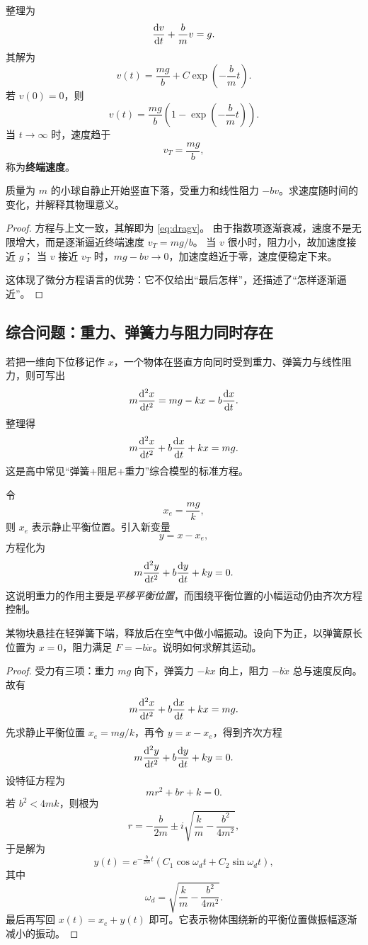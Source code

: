 整理为
\[
  \dv{v}{t}+\frac{b}{m}v=g.
\]
其解为
\[
  v(t)=\frac{mg}{b}+C\exp\left(-\frac{b}{m}t\right).
\]
若 $v(0)=0$，则
\begin{equation}
  v(t)=\frac{mg}{b}\left(1-\exp\left(-\frac{b}{m}t\right)\right).
  \label{eq:dragv}
\end{equation}
当 $t\to\infty$ 时，速度趋于
\[
  v_T=\frac{mg}{b},
\]
称为\textbf{终端速度}。

\begin{example}[线性阻力下的下落]
质量为 $m$ 的小球自静止开始竖直下落，受重力和线性阻力 $-bv$。求速度随时间的变化，并解释其物理意义。
\end{example}

\begin{proof}
方程与上文一致，其解即为 \cref{eq:dragv}。
由于指数项逐渐衰减，速度不是无限增大，而是逐渐逼近终端速度 $v_T=mg/b$。
当 $v$ 很小时，阻力小，故加速度接近 $g$；
当 $v$ 接近 $v_T$ 时，$mg-bv\to 0$，加速度趋近于零，速度便稳定下来。

这体现了微分方程语言的优势：它不仅给出“最后怎样”，还描述了“怎样逐渐逼近”。
\end{proof}

\subsection{综合问题：重力、弹簧力与阻力同时存在}

若把一维向下位移记作 $x$，一个物体在竖直方向同时受到重力、弹簧力与线性阻力，则可写出
\[
  m\dv[2]{x}{t}=mg-kx-b\dv{x}{t}.
\]
整理得
\begin{equation}
  m\dv[2]{x}{t}+b\dv{x}{t}+kx=mg.
  \label{eq:damped-shifted}
\end{equation}
这是高中常见“弹簧+阻尼+重力”综合模型的标准方程。

令
\[
  x_e=\frac{mg}{k},
\]
则 $x_e$ 表示静止平衡位置。引入新变量
\[
  y=x-x_e,
\]
方程化为
\[
  m\dv[2]{y}{t}+b\dv{y}{t}+ky=0.
\]
这说明重力的作用主要是\emph{平移平衡位置}，而围绕平衡位置的小幅运动仍由齐次方程控制。

\begin{example}[带阻尼的竖直弹簧]
某物块悬挂在轻弹簧下端，释放后在空气中做小幅振动。设向下为正，以弹簧原长位置为 $x=0$，阻力满足 $F=-b\dot{x}$。说明如何求解其运动。
\end{example}

\begin{proof}
受力有三项：重力 $mg$ 向下，弹簧力 $-kx$ 向上，阻力 $-b\dot{x}$ 总与速度反向。故有
\[
  m\dv[2]{x}{t}+b\dv{x}{t}+kx=mg.
\]
先求静止平衡位置 $x_e=mg/k$，再令 $y=x-x_e$，得到齐次方程
\[
  m\dv[2]{y}{t}+b\dv{y}{t}+ky=0.
\]
设特征方程为
\[
  mr^2+br+k=0.
\]
若 $b^2<4mk$，则根为
\[
  r=-\frac{b}{2m}\pm i\sqrt{\frac{k}{m}-\frac{b^2}{4m^2}},
\]
于是解为
\[
  y(t)=e^{-\frac{b}{2m}t}\left(C_1\cos \omega_d t+C_2\sin \omega_d t\right),
\]
其中
\[
  \omega_d=\sqrt{\frac{k}{m}-\frac{b^2}{4m^2}}.
\]
最后再写回 $x(t)=x_e+y(t)$ 即可。它表示物体围绕新的平衡位置做振幅逐渐减小的振动。
\end{proof}

